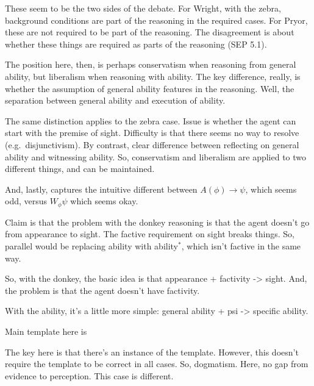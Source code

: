\documentclass[10pt]{article}
\begin{document}
\begin{note}
  These seem to be the two sides of the debate.
  For Wright, with the zebra, background conditions are part of the reasoning in the required cases.
  For Pryor, these are not required to be part of the reasoning.
  The disagreement is about whether these things are required as parts of the reasoning (SEP 5.1).

  The position here, then, is perhaps conservatism when reasoning from general ability, but liberalism when reasoning with ability.
  The key difference, really, is whether the assumption of general ability features in the reasoning.
  Well, the separation between general ability and execution of ability.

  The same distinction applies to the zebra case.
  Issue is whether the agent can start with the premise of sight.
  Difficulty is that there seems no way to resolve (e.g.\ disjunctivism).
  By contrast, clear difference between reflecting on general ability and witnessing ability.
  So, conservatism and liberalism are applied to two different things, and can be maintained.

  And, lastly, captures the intuitive different between \(A(\phi) \rightarrow \psi\), which seems odd, versus \(W_{\phi}\psi\) which seems okay.
\end{note}

\begin{note}
  Claim is that the problem with the donkey reasoning is that the agent doesn't go from appearance to sight.
  The factive requirement on sight breaks things.
  So, parallel would be replacing ability with ability\(^{*}\), which isn't factive in the same way.

  So, with the donkey, the basic idea is that appearance + factivity -> sight.
  And, the problem is that the agent doesn't have factivity.

  With the ability, it's a little more simple: general ability + psi -> specific ability.
\end{note}


\begin{note}[Template]
  Main template here is \citeauthor{Wright:2003aa}
\end{note}

\begin{note}
  The key here is that there's an instance of the template.
  However, this doesn't require the template to be correct in all cases.
  So, dogmatism.
  Here, no gap from evidence to perception.
  This case is different.
\end{note}
\end{document}
